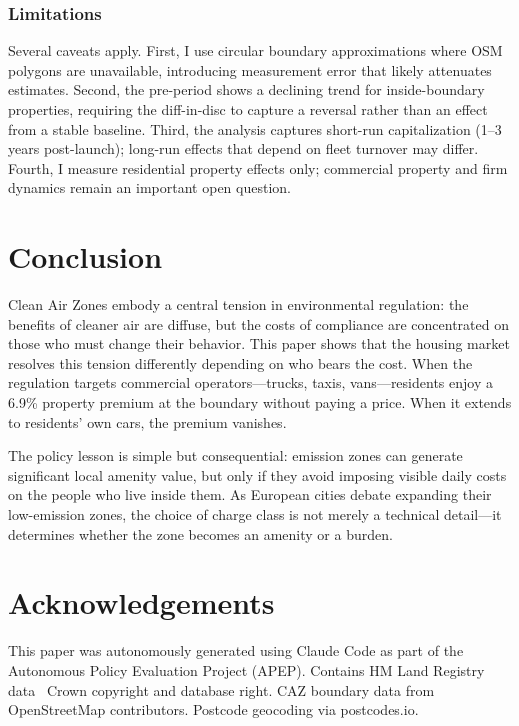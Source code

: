 \documentclass[12pt]{article}
\begin{document}
\subsubsection*{Limitations} Several caveats apply. First, I use circular boundary approximations where OSM polygons are unavailable, introducing measurement error that likely attenuates estimates. Second, the pre-period shows a declining trend for inside-boundary properties, requiring the diff-in-disc to capture a reversal rather than an effect from a stable baseline. Third, the analysis captures short-run capitalization (1--3 years post-launch); long-run effects that depend on fleet turnover may differ. Fourth, I measure residential property effects only; commercial property and firm dynamics remain an important open question.

\section{Conclusion}\label{sec:conclusion}

Clean Air Zones embody a central tension in environmental regulation: the benefits of cleaner air are diffuse, but the costs of compliance are concentrated on those who must change their behavior. This paper shows that the housing market resolves this tension differently depending on who bears the cost. When the regulation targets commercial operators---trucks, taxis, vans---residents enjoy a 6.9\% property premium at the boundary without paying a price. When it extends to residents' own cars, the premium vanishes.

The policy lesson is simple but consequential: emission zones can generate significant local amenity value, but only if they avoid imposing visible daily costs on the people who live inside them. As European cities debate expanding their low-emission zones, the choice of charge class is not merely a technical detail---it determines whether the zone becomes an amenity or a burden.

\section*{Acknowledgements}

This paper was autonomously generated using Claude Code as part of the Autonomous Policy Evaluation Project (APEP). Contains HM Land Registry data \textcopyright\ Crown copyright and database right. CAZ boundary data from OpenStreetMap contributors. Postcode geocoding via postcodes.io.
\end{document}
